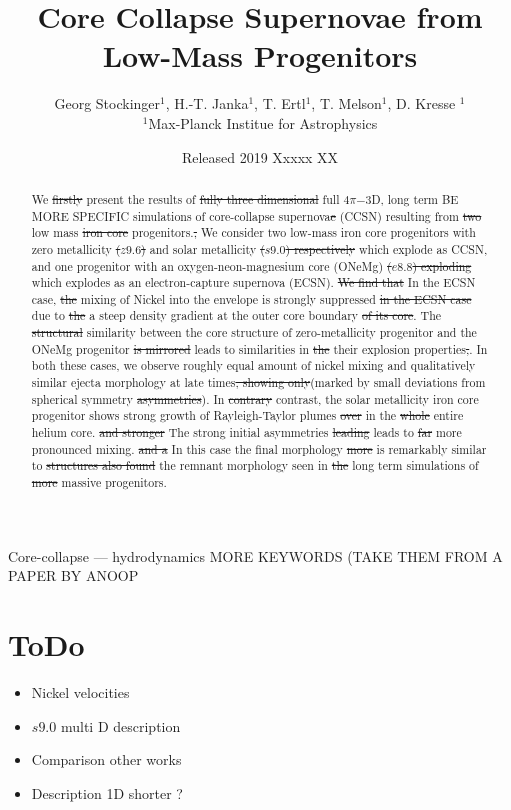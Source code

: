 \documentclass[fleqn,usenatbib]{mnras}
\title{Core Collapse Supernovae from Low-Mass Progenitors}
\author[G. Stockinger et. al]{Georg Stockinger$^1$, H.-T. Janka$^1$, T. Ertl$^1$, T. Melson$^1$, D. Kresse $^1$\\
$^1$Max-Planck Institue for Astrophysics}
\date{Released 2019 Xxxxx XX}
\newcommand{\NY}[2]{{\color{blue}\sout{#1}#2}}
\begin{document}
\maketitle
\pagerange{\pageref{firstpage}--\pageref{lastpage}} 

\begin{abstract}
We \NY{firstly}{} present the results of \NY{fully three dimensional}{ full $4\pi\mathord{-}$3D,} long term \NY{}{BE MORE SPECIFIC} simulations of core-collapse supernova\NY{e}{} (CCSN) \NY{}{resulting} from \NY{two}{} low mass \NY{iron core}{} progenitors.\NY{,}{} \NY{}{We consider two low-mass iron core progenitors} with zero \NY{}{metallicity} \NY{($z9.6$)}{ and} solar metallicity \NY{($s9.0$) respectively}{ which explode as CCSN}, and one progenitor with an oxygen-neon-magnesium core \NY{}{(ONeMg)} \NY{($e8.8$) exploding}{ which explodes} as an electron-capture supernova (ECSN). \NY{We find that}{ In the ECSN case,} \NY{the}{} mixing of Nickel into the envelope is strongly suppressed \NY{in the ECSN case}{} due to \NY{the}{ a} steep density gradient at the outer \NY{}{core} boundary \NY{of its core}{}. The \NY{structural}{} similarity between the \NY{}{core structure of} zero-metallicity progenitor and the ONeMg progenitor \NY{is mirrored}{ leads to similarities} in \NY{the}{ their} explosion properties\NY{,}{.} \NY{}{In both these cases, we observe roughly equal} amount of nickel mixing and \NY{}{qualitatively similar}{} ejecta morphology at late times\NY{, showing only}{(marked by} small \NY{}{deviations from spherical symmetry} \NY{asymmetries}{)}. In \NY{contrary}{ contrast,} the solar metallicity iron core progenitor shows strong growth of Rayleigh-Taylor plumes \NY{over}{ in} the \NY{whole}{ entire} helium core\NY{}{.} \NY{and stronger}{ The strong} initial asymmetries \NY{leading}{ leads} to \NY{far}{} more pronounced mixing\NY{}{.} \NY{and a}{ In this case the} final morphology \NY{more}{ is remarkably} similar to \NY{structures also found}{ the remnant morphology seen in} \NY{the}{} long term simulation\NY{}{s} of \NY{more}{} massive progenitors. 

\end{abstract}

\begin{keywords}
Core-collapse --- hydrodynamics
\NY{}{MORE KEYWORDS (TAKE THEM FROM A PAPER BY ANOOP}
\end{keywords}
\noindent

\section{ToDo}
\begin{itemize}
    \item Nickel velocities
    \item $s9.0$ multi D description
    \item Comparison other works
    \item Description 1D shorter ?
\end{itemize}
\end{document}
